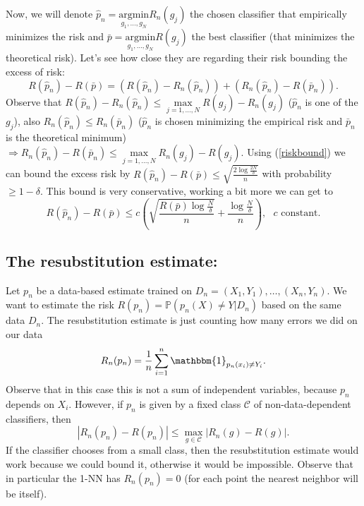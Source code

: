 \documentclass[11pt, english]{article}
\begin{document}
Now, we will denote $\hat{p}_n=\underset{g_1,\dots,g_N}{\text{argmin}}R_n(g_j)$ the chosen classifier that empirically minimizes the risk and $\bar{p}=\underset{g_1,\dots,g_N}{\text{argmin}}R(g_j)$ the best classifier (that minimizes the theoretical risk). Let's see how close they are regarding their risk bounding the excess of risk:
\begin{equation}
	R(\hat{p}_n)-R(\bar{p})=(R(\hat{p}_n)-R_n(\hat{p}_n))+(R_n(\hat{p}_n)-R(\bar{p}_n)).
\end{equation}
Observe that $R(\hat{p}_n)-R_n(\hat{p}_n)\leq\underset{j=1,\dots,N}{\max}R(g_j)-R_n(g_j)$ ($\hat{p}_n$ is one of the $g_j$), also $R_n(\hat{p}_n)\leq R_n(\bar{p}_n)$ ($\hat{p}_n$ is chosen minimizing the empirical risk and $\bar{p}_n$ is the theoretical minimum) $\Rightarrow R_n(\hat{p}_n)-R(\bar{p}_n)\leq \underset{j=1,\dots,N}{\max}R_n(g_j)-R(g_j)$. Using (\ref{riskbound}) we can bound the excess risk by $R(\hat{p}_n)-R(\bar{p})\leq \sqrt{\frac{2\log\frac{2N}{\delta}}{n}}$ with probability $\geq 1-\delta$. This bound is very conservative, working a bit more we can get to
\begin{equation}
	R(\hat{p}_n)-R(\bar{p})\leq c\left(\sqrt{\frac{R(\bar{p})\log\frac{N}{\delta}}{n}}+\frac{\log\frac{N}{\delta}}{n}\right), \text{ }c \text{ constant}.
\end{equation}
\subsection{The resubstitution estimate:}

Let $p_n$ be a data-based estimate trained on $D_n=(X_1,Y_1),\dots,(X_n,Y_n)$. We want to estimate the risk $R(p_n)=\mathbb{P}(p_n(X)\neq Y|D_n)$ based on the same data $D_n$. The resubstitution estimate is just counting how many errors we did on our data
\begin{equation}
	R_n(p_n)=\frac{1}{n}\sum\limits_{i=1}^n\mathbbm{1}_{p_n(x_i)\neq Y_i}.
\end{equation}
Observe that in this case this is not a sum of independent variables, because $p_n$ depends on $X_i$. However, if $p_n$ is given by a fixed class $\mathcal{C}$ of non-data-dependent classifiers, then 
\begin{equation}
	|R_n(p_n)-R(p_n)|\leq\underset{g\in\mathcal{C}}{\max}|R_n(g)-R(g)|.
\end{equation}
If the classifier chooses from a small class, then the resubstitution estimate would work because we could bound it, otherwise it would be impossible. Observe that in particular the 1-NN has $R_n(p_n)=0$ (for each point the nearest neighbor will be itself).
\end{document}
